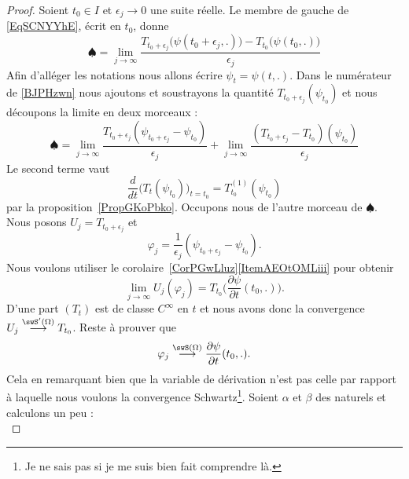 \begin{proof}
    Soient \( t_0\in I\) et \( \epsilon_j\to 0\) une suite réelle. Le membre de gauche de \eqref{EqSCNYYhE}, écrit en \( t_0\), donne
    \begin{equation}    \label{BJPHzwn}
        \spadesuit=\lim_{j\to \infty} \frac{ T_{t_0+\epsilon_j}\big( \psi(t_0+\epsilon_j,.) \big)-T_{t_0}\big( \psi(t_0,.) \big) }{ \epsilon_j }
    \end{equation}
    Afin d'alléger les notations nous allons écrire \( \psi_t=\psi(t,.)\). Dans le numérateur de \eqref{BJPHzwn} nous ajoutons et soustrayons la quantité \( T_{t_0+\epsilon_j}(\psi_{t_0})\) et nous découpons la limite en deux morceaux :
    \begin{equation}
        \spadesuit=\lim_{j\to \infty} \frac{ T_{t_0+\epsilon_j}(\psi_{t_0+\epsilon_j}-\psi_{t_0}) }{ \epsilon_j }+\lim_{j\to \infty} \frac{ (T_{t_0+\epsilon_j}-T_{t_0})(\psi_{t_0}) }{ \epsilon_j }
    \end{equation}
    Le second terme vaut
    \begin{equation}
        \frac{ d }{ dt }\Big( T_t(\psi_{t_0}) \Big)_{t=t_0}=T_{t_0}^{(1)}(\psi_{t_0})
    \end{equation}
    par la proposition~\ref{PropGKoPbko}. Occupons nous de l'autre morceau de \( \spadesuit\). Nous posons \( U_j=T_{t_0+\epsilon_j}\) et
    \begin{equation}
        \varphi_j=\frac{1}{ \epsilon_j }(\psi_{t_0+\epsilon_j}-\psi_{t_0}).
    \end{equation}
    Nous voulons utiliser le corolaire~\ref{CorPGwLluz}\ref{ItemAEOtOMLiii} pour obtenir
    \begin{equation}
        \lim_{j\to \infty} U_j(\varphi_j)=T_{t_0}\Big( \frac{ \partial \psi }{ \partial t }(t_0,.) \Big).
    \end{equation}
    D'une part \( (T_t)\) est de classe \(  C^{\infty}\) en \( t\) et nous avons donc la convergence \( U_j\stackrel{\swS'(\Omega)}{\longrightarrow}T_{t_0}\). Reste à prouver que
    \begin{equation}
        \varphi_j\stackrel{\swS(\Omega)}{\longrightarrow}\frac{ \partial \psi }{ \partial t }(t_0,.).
    \end{equation}
    Cela en remarquant bien que la variable de dérivation n'est pas celle par rapport à laquelle nous voulons la convergence Schwartz\footnote{Je ne sais pas si je me suis bien fait comprendre là.}. Soient \( \alpha\) et \( \beta\) des naturels et calculons un peu :
    \begin{equation}    \label{EqEBUYDRA}

\end{equation}
\end{proof}
